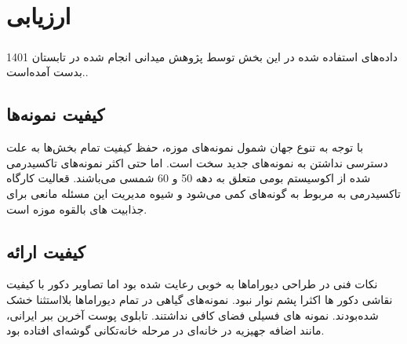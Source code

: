 
\chapter{ارزیابی} \label{chapter:evaluation}

\paragraph*{}
داده‌های استفاده شده در این بخش توسط پژوهش میدانی انجام شده در تابستان 1401 بدست آمده‌است..

\section{کیفیت نمونه‌ها}

با توجه به تنوع جهان شمول نمونه‌های موزه، حفظ کیفیت تمام بخش‌ها به علت دسترسی نداشتن به نمونه‌های جدید سخت است. اما حتی اکثر نمونه‌های تاکسیدرمی شده از اکوسیستم بومی  متعلق به دهه 50 و 60 شمسی می‌باشند. قعالیت کارگاه تاکسیدرمی به مربوط به گونه‌های کمی ‌می‌شود و شیوه مدیریت این مسئله مانعی برای جذابیت های بالقوه موزه است.

\section{کیفیت ارائه}

نکات فنی در طراحی دیوراماها به خوبی رعایت شده بود اما تصاویر دکور با کیفیت نقاشی دکور ها اکثرا پشم نوار نبود.
نمونه‌های گیاهی در تمام دیوراماها بلااستثنا خشک شده‌بودند.
نمونه های فسیلی فضای کافی نداشتند.
تابلوی پوست آخرین ببر ایرانی، مانند اضافه جهیزیه در خانه‌ای در مرحله خانه‌تکانی گوشه‌ای افتاده بود.
